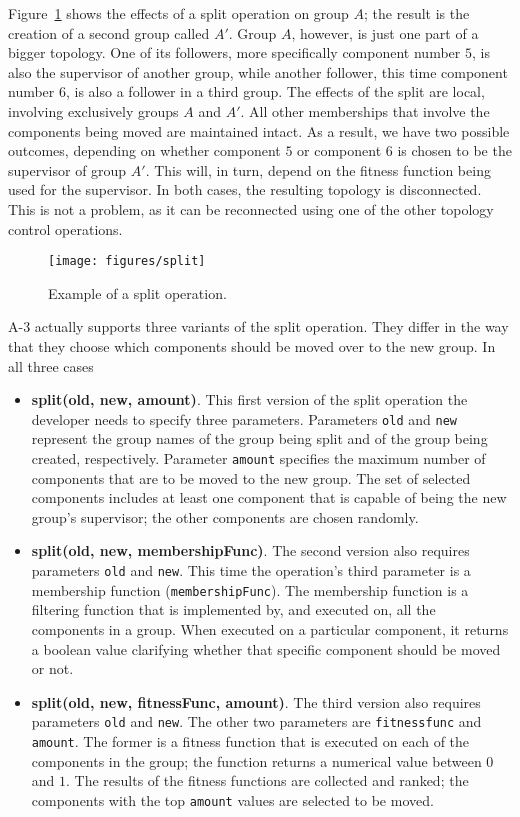 Figure~\ref{fig:split} shows the effects of a split operation on group $A$; the result is the creation of a second group called $A'$. Group $A$, however, is just one part of a bigger topology. One of its followers, more specifically component number $5$, is also the supervisor of another group, while another follower, this time component number $6$, is also a follower in a third group. The effects of the split are local, involving exclusively groups $A$ and $A'$. All other memberships that involve the components being moved are maintained intact. As a result, we have two possible outcomes, depending on whether component $5$ or component $6$ is chosen to be the supervisor of group $A'$. This will, in turn, depend on the fitness function being used for the supervisor. In both cases, the resulting topology is disconnected. This is not a problem, as it can be reconnected using one of the other topology control operations.

\begin{figure}[htb]
	\begin{center}
		\texttt{[image: figures/split]}
	\end{center}
	\caption{Example of a split operation.}
	\label{fig:split}
\end{figure}

A-3 actually supports three variants of the split operation. They differ in the way that they choose which components should be moved over to the new group. In all three cases   

\begin{itemize}
	\item \textbf{split(old, new, amount)}. This first version of the split operation the developer needs to specify three parameters. Parameters \texttt{old} and \texttt{new} represent the group names of the group being split and of the group being created, respectively. Parameter \texttt{amount} specifies the maximum number of components that are to be moved to the new group. The set of selected components includes at least one component that is capable of being the new group's supervisor; the other components are chosen randomly.
	\item \textbf{split(old, new, membershipFunc)}. The second version also requires parameters \texttt{old} and \texttt{new}. This time the operation's third parameter is a membership function (\texttt{membershipFunc}). The membership function is a filtering function that is implemented by, and executed on, all the components in a group. When executed on a particular component, it returns a boolean value clarifying whether that specific component should be moved or not.
	\item \textbf{split(old, new, fitnessFunc, amount)}. The third version also requires parameters \texttt{old} and \texttt{new}. The other two parameters are \texttt{fitnessfunc} and \texttt{amount}. The former is a fitness function that is executed on each of the components in the group; the function returns a numerical value between $0$ and $1$. The results of the fitness functions are collected and ranked; the components with the top \texttt{amount} values are selected to be moved.
\end{itemize}

